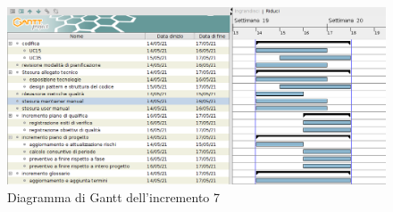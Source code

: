 \begin{figure}[!ht]
    \caption{Diagramma di Gantt dell'incremento 7}
    \vspace{5px}
    \includegraphics[scale=0.3]{../../../Images/Diagrammi/Gantt/incremento7.png}
    \centering
\end{figure}

